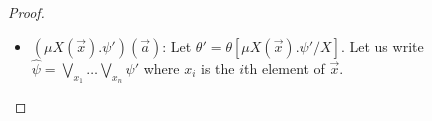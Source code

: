 \begin{proof}
\begin{enumerate}
\begin{itemize}
\begin{align*}
				|\orb[\Ncal](\clos_\phi(\psi, \gamma,\theta)) |
				&\leq \sum\nolimits_{a \in \Ncal} |\orb[\Ncal](\clos_\phi(\psi',(\gamma, \{a/x\}), \theta))| \\
				&\quad + |\orb[\Ncal \cup \{b\}](\clos_\phi(\psi',(\gamma, \{ a /  x\}), \theta))|+1\\
				&\overset{\text{IH}}{\leq}
				\sum\nolimits_{a \in \Ncal} |\psi'|\cdot m'(\psi',(\gamma, \{a/x\}),\theta) \\
				&\quad + |\psi'|\cdot m'(\psi',(\gamma, \{ a /  x\})\theta)+1
			\end{align*}
			For $a \in \Ncal$, then $m'(\psi',(\gamma, \{a/x\}),\theta) = (|\Ncal| + \|\psi\| - 1)!/|\Ncal|! = m'(\psi,\gamma,\theta)/(|\Ncal|+\|\psi\|)$. 
			For $b \notin \supp(\psi',\gamma,\theta)$, then $m'(\psi',(\gamma, \{\vec a / \vec x\}),\theta) = (|\Ncal| + \|\psi\|) / (|\Ncal| + 1)! = m'(\psi)/(|\Ncal| + 1)$.
			Thus, we obtain:
			\begin{align*}
				|\orb[\Ncal](\clos_\phi(\psi,\gamma, \theta)| 
				&\le 
				\sum\nolimits_{a \in \Ncal} |\psi'|\cdot m'(\psi,(\gamma, \{a/x\}),\theta)/(|\Ncal|+1)\\
				&\quad + |\psi'|\cdot m'(\psi,\gamma,\theta)/(|\Ncal|+1)+1
				\\
				&=|\psi'|\cdot m'(\psi,\gamma,\theta)/(|\Ncal|+1)\cdot (|\Ncal|+1)+1 
				\\
				&=|\psi'|\cdot m'(\psi,\gamma,\theta)+1
				\leq |\psi|\cdot m'(\psi,\gamma,\theta)
			\end{align*}
			A similar argument can be shown for $\bigwedge\nolimits_x \psi'$ and $\fresh{x} \psi'$.
			\item $(\mu X(\vec x).\psi')(\vec a)$: 
			Let $\theta' = \theta[\mu X(\vec x).\psi' / X]$.
			Let us write $\hat \psi = \bigvee\nolimits_{x_1}\dots\bigvee\nolimits_{x_n}\psi'$ where $x_i$ is the $i$th element of $\vec x$.

\end{itemize}
\end{enumerate}
\end{proof}
